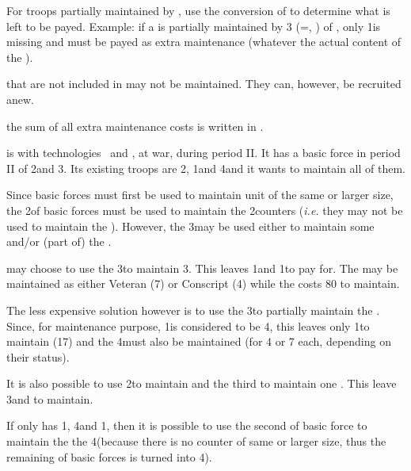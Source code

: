 \aparag For troops partially maintained by , use the
conversion of  to determine what is left to be payed.
\bparag Example: if a \FLEET\Faceplus is partially maintained by 3\ND
(=\FLEET\Facemoins, \ND) of , only 1\ND is missing and must
be payed as extra maintenance (whatever the actual content of the \FLEET).

\aparag \corsaire that are not included in  may not be
maintained. They can, however, be recruited anew.


\aparag the sum of all extra maintenance costs is written in .

\begin{exemple}
  \SPA is with technologies \TREN\ and \TGLN, at war, during period II. It has
  a basic force in period II of 2\ARMY\faceplus and 3\GD. Its existing troops
  are 2\ARMY\faceplus, 1\FLEET\faceplus and 4\LD and it wants to maintain all
  of them.

  Since basic forces must first be used to maintain unit of the same or larger
  size, the 2\ARMY\Faceplus of basic forces must be used to maintain the
  2\ARMY\Faceplus counters (\emph{i.e.} they may not be used to maintain the
  \LD). However, the 3\GD may be used either to maintain some \LD and/or (part
  of) the \FLEET.

  \SPA may choose to use the 3\GD to maintain 3\LD. This leaves 1\LD and
  1\FLEET\Faceplus to pay for. The \LD may be maintained as either Veteran
  (7\ducats) or Conscript (4\ducats) while the \FLEET\Faceplus costs 80\ducats
  to maintain.

  The less expensive solution however is to use the 3\GD to partially maintain
  the \FLEET. Since, for maintenance purpose, 1\FLEET\Faceplus is considered
  to be 4\ND, this leaves only 1\ND to maintain (17\ducats) and the 4\LD must
  also be maintained (for 4 or 7 \ducats each, depending on their status).

  It is also possible to use 2\GD to maintain \FLEET\Facemoins and the third
  to maintain one \LD. This leave 3\LD and \FLEET\Facemoins to maintain.

  \smallskip

  If \SPA only has 1\ARMY\Faceplus, 4\LD and 1\FLEET\Faceplus, then it is
  possible to use the second \ARMY\faceplus of basic force to maintain the the
  4\LD (because there is no counter of same or larger size, thus the remaining
  \ARMY\Faceplus of basic forces is turned into 4\LD).


\end{exemple}
